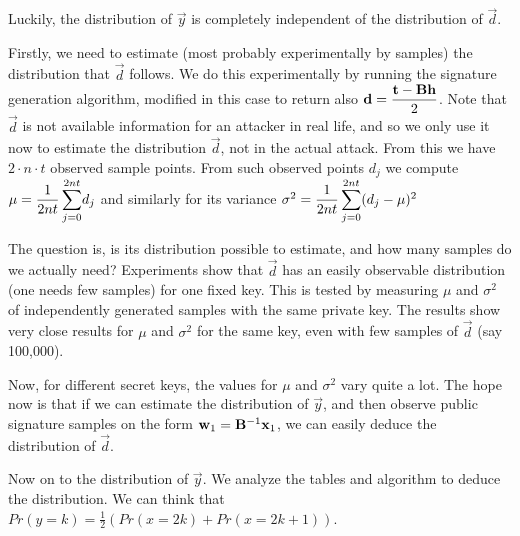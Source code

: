 Luckily, the distribution of $\vec{y}$ is completely independent of the distribution of $\vec{d}$. 

Firstly, we need to estimate (most probably experimentally by samples) the distribution that $\vec{d}$ follows.
We do this experimentally by running the signature generation algorithm, modified in this case to return also $\vec{d} = \mathlarger{\frac{\vec{t}-\mat{B} \vec{h}}{2}}$.
Note that $\vec{d}$ is not available information for an attacker in real life, and so we only use it now to estimate the distribution $\vec{d}$, not
in the actual attack. From this we have $2 \cdot n\cdot t$ observed sample points. From such observed points $d_j$ we compute 
$\mu = \mathlarger{\frac{1}{2nt} \sum_{j = 0}^{2nt}} d_j$ and similarly for its variance $\sigma^2 = \mathlarger{\frac{1}{2nt} \sum_{j = 0}^{2nt}} (d_j - \mu)^2$

The question is, is its distribution possible to estimate, and how many samples do we actually need?
Experiments show that $\vec{d}$ has an easily observable distribution (one needs few samples) for one fixed key. This is tested by measuring $\mu$ and $\sigma^2$ of independently generated samples with the
same private key. The results show very close results for $\mu$ and $\sigma^2$ for the same key, even with few samples of $\vec{d}$ (say 100,000).

Now, for different secret keys, the values for $\mu$ and $\sigma^2$ vary quite a lot.
The hope now is that if we can estimate the distribution of $\vec{y}$, and then observe public signature samples on the form $\mathbf{w}_1 = \mathbf{B}^{-1} \mathbf{x}_1$, we can easily deduce the distribution of $\vec{d}$.

Now on to the distribution of $\vec{y}$. We analyze the tables and algorithm to deduce the distribution.
We can think that $Pr(y = k) = \frac{1}{2} (Pr(x=2k) + Pr(x = 2k + 1))$.

